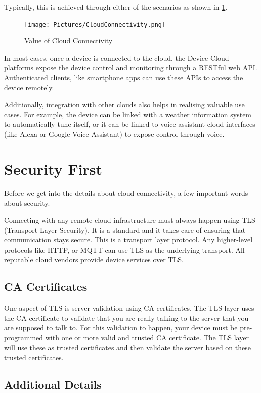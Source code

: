 \documentclass[11pt,fleqn]{book} %
\begin{document}
Typically, this is achieved through either of the scenarios as shown in \ref{fig:cloud_connectivity}.

\begin{figure}
    \centering
    \texttt{[image: Pictures/CloudConnectivity.png]}
    \caption{Value of Cloud Connectivity}
    \label{fig:cloud_connectivity}
\end{figure}

In most cases, once a device is connected to the cloud, the Device Cloud platforms expose the device control and monitoring through a RESTful web API. Authenticated clients, like smartphone apps can use these APIs to access the device remotely.

Additionally, integration with other clouds also helps in realising valuable use cases. For example, the device can be linked with a weather information system to automatically tune itself, or it can be linked to voice-assistant cloud interfaces (like Alexa or Google Voice Assistant) to expose control through voice.

\section{Security First}
Before we get into the details about cloud connectivity, a few important words about security. 

Connecting with any remote cloud infrastructure must always happen using TLS (Transport Layer Security). It is a standard and it takes care of ensuring that communication stays secure. This is a transport layer protocol. Any higher-level protocols like HTTP, or MQTT can use TLS as the underlying transport. All reputable cloud vendors provide device services over TLS.

\subsection{CA Certificates}
One aspect of TLS is server validation using CA certificates. The TLS layer uses the CA certificate to validate that you are really talking to the server that you are supposed to talk to. For this validation to happen, your device must be pre-programmed with one or more valid and trusted CA certificate. The TLS layer will use these as trusted certificates and then validate the server based on these trusted certificates.

\subsection{Additional Details}
\end{document}
